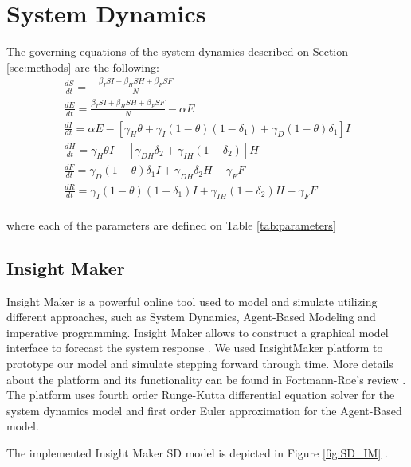 \documentclass[10pt]{article}
\begin{document}
 


\section{System Dynamics}

 The governing equations of the system dynamics described on Section \ref{sec:methods} are the following: \\

\begin{eqnarray} 
\label{SDeqn}
\frac{dS}{dt} = - \frac{\beta_{I}SI+\beta_{H}SH+\beta_{F}SF}{N}\\
\frac{dE}{dt} =  \frac{\beta_{I}SI+\beta_{H}SH+\beta_{F}SF}{N}-\alpha E\\
\frac{dI}{dt} =  \alpha E - [\gamma_{H}\theta + \gamma_{I}(1-\theta)(1-\delta_{1})+\gamma_{D}(1-\theta)\delta_{1}]I\\
\frac{dH}{dt} = \gamma_{H}\theta I - [\gamma_{DH}\delta_{2}+\gamma_{IH}(1-\delta_{2})]H\\
\frac{dF}{dt} = \gamma_{D}(1-\theta) \delta_{1} I + \gamma_{DH}\delta_{2} H-\gamma_{F} F\\
\frac{dR}{dt} = \gamma_{I}(1-\theta)(1- \delta_{1}) I + \gamma_{IH}(1-\delta_{2}) H-\gamma_{F} F
\end{eqnarray}\\

\noindent where each of the parameters are defined on Table \ref{tab:parameters} \\


\subsection{Insight Maker}
 Insight Maker is a powerful online tool used to model and simulate utilizing different approaches, such as System Dynamics, Agent-Based Modeling and imperative programming. Insight Maker allows to construct a graphical model interface to forecast the system response \cite{FortmannRoe}. We used InsightMaker platform to prototype our model and simulate stepping forward through time. More details about the platform and its functionality can be found in Fortmann-Roe's review \cite{FortmannRoe}. The platform uses fourth order Runge-Kutta differential equation solver for the system dynamics model and  first order Euler approximation for the Agent-Based model.

\noindent The implemented Insight Maker SD model is depicted in Figure \ref{fig:SD_IM} .
\end{document}
